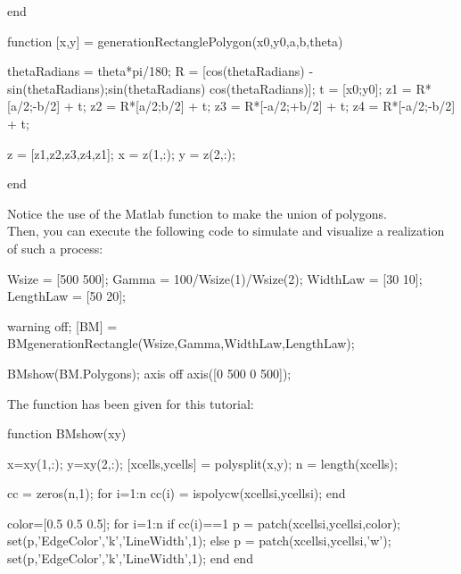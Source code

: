 \begin{mremark}
\begin{matlab}
end
\end{matlab}
\begin{matlab}
function [x,y] = generationRectanglePolygon(x0,y0,a,b,theta)

%

thetaRadians = theta*pi/180;
R = [cos(thetaRadians) -sin(thetaRadians);sin(thetaRadians) cos(thetaRadians)];
t = [x0;y0];
z1 = R*[a/2;-b/2] + t;
z2 = R*[a/2;b/2] + t;
z3 = R*[-a/2;+b/2] + t;
z4 = R*[-a/2;-b/2] + t;

z = [z1,z2,z3,z4,z1];
x = z(1,:);
y = z(2,:);

end
\end{matlab}
\noindent Notice the use of the Matlab function  to make the union of polygons.\\
\noindent Then, you can execute the following code to simulate and visualize a realization of such a process:
\begin{matlab}
Wsize = [500 500];
Gamma = 100/Wsize(1)/Wsize(2);
WidthLaw = [30 10]; 
LengthLaw = [50 20];

warning off;
[BM] = BMgenerationRectangle(Wsize,Gamma,WidthLaw,LengthLaw);

BMshow(BM.Polygons);
axis off
axis([0 500 0 500]);
\end{matlab}
\noindent The function  has been given for this tutorial:
\begin{matlab}
function BMshow(xy)

x=xy(1,:);
y=xy(2,:);
[xcells,ycells] = polysplit(x,y);
n = length(xcells);

cc = zeros(n,1);
for i=1:n
   cc(i) = ispolycw(xcells{i},ycells{i});
end

color=[0.5 0.5 0.5];
for i=1:n
   if cc(i)==1
       p = patch(xcells{i},ycells{i},color);
       set(p,'EdgeColor','k','LineWidth',1);
   else
       p = patch(xcells{i},ycells{i},'w');
       set(p,'EdgeColor','k','LineWidth',1);
   end
end


\end{matlab}
\end{mremark}
